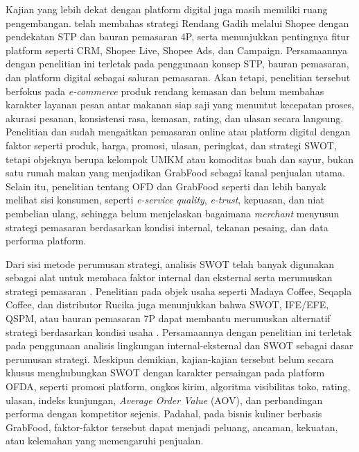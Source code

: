 Kajian yang lebih dekat dengan platform digital juga masih memiliki ruang pengembangan. \textcite{sophia2025rendanggadih} telah membahas strategi Rendang Gadih melalui Shopee dengan pendekatan STP dan bauran pemasaran 4P, serta menunjukkan pentingnya fitur platform seperti CRM, Shopee Live, Shopee Ads, dan Campaign. Persamaannya dengan penelitian ini terletak pada penggunaan konsep STP, bauran pemasaran, dan platform digital sebagai saluran pemasaran. Akan tetapi, penelitian tersebut berfokus pada \textit{e-commerce} produk rendang kemasan dan belum membahas karakter layanan pesan antar makanan siap saji yang menuntut kecepatan proses, akurasi pesanan, konsistensi rasa, kemasan, rating, dan ulasan secara langsung. Penelitian \textcite{ruhiyat2023minatbeli} dan \textcite{khairani2022buahsayur} sudah mengaitkan pemasaran online atau platform digital dengan faktor seperti produk, harga, promosi, ulasan, peringkat, dan strategi SWOT, tetapi objeknya berupa kelompok UMKM atau komoditas buah dan sayur, bukan satu rumah makan yang menjadikan GrabFood sebagai kanal penjualan utama. Selain itu, penelitian tentang OFD dan GrabFood seperti \textcite{putri2022grabfood} dan \textcite{elverda2025ofdindonesia} lebih banyak melihat sisi konsumen, seperti \textit{e-service quality}, \textit{e-trust}, kepuasan, dan niat pembelian ulang, sehingga belum menjelaskan bagaimana \textit{merchant} menyusun strategi pemasaran berdasarkan kondisi internal, tekanan pesaing, dan data performa platform.

Dari sisi metode perumusan strategi, analisis SWOT telah banyak digunakan sebagai alat untuk membaca faktor internal dan eksternal serta merumuskan strategi pemasaran \parencite{gurel2017swot,helms2010swotreview,ratnawati2020swot,syafaat2020sepatu}. Penelitian pada objek usaha seperti Madaya Coffee, Seqapla Coffee, dan distributor Rucika juga menunjukkan bahwa SWOT, IFE/EFE, QSPM, atau bauran pemasaran 7P dapat membantu merumuskan alternatif strategi berdasarkan kondisi usaha \parencite{hendrizon2024madayacoffee,haliza2023seqapla,ramadhanti2023rucika}. Persamaannya dengan penelitian ini terletak pada penggunaan analisis lingkungan internal-eksternal dan SWOT sebagai dasar perumusan strategi. Meskipun demikian, kajian-kajian tersebut belum secara khusus menghubungkan SWOT dengan karakter persaingan pada platform OFDA, seperti promosi platform, ongkos kirim, algoritma visibilitas toko, rating, ulasan, indeks kunjungan, \textit{Average Order Value} (AOV), dan perbandingan performa dengan kompetitor sejenis. Padahal, pada bisnis kuliner berbasis GrabFood, faktor-faktor tersebut dapat menjadi peluang, ancaman, kekuatan, atau kelemahan yang memengaruhi penjualan.

